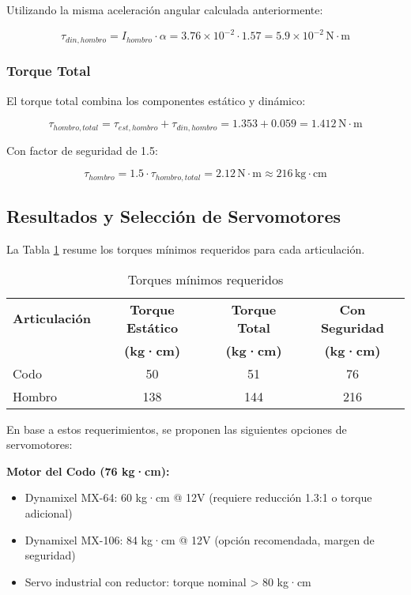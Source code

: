 Utilizando la misma aceleración angular calculada anteriormente:

\begin{equation}
\tau_{din,hombro} = I_{hombro} \cdot \alpha = 3.76 \times 10^{-2} \cdot 1.57 = 5.9 \times 10^{-2} \, \text{N} \cdot \text{m}
\end{equation}

\subsubsection{Torque Total}

El torque total combina los componentes estático y dinámico:

\begin{equation}
\tau_{hombro,total} = \tau_{est,hombro} + \tau_{din,hombro} = 1.353 + 0.059 = 1.412 \, \text{N} \cdot \text{m}
\end{equation}

Con factor de seguridad de 1.5:

\begin{equation}
\tau_{hombro} = 1.5 \cdot \tau_{hombro,total} = 2.12 \, \text{N} \cdot \text{m} \approx 216 \, \text{kg} \cdot \text{cm}
\end{equation}

\subsection{Resultados y Selección de Servomotores}

La Tabla \ref{tab:resultados_torque} resume los torques mínimos requeridos para cada articulación.

\begin{table}[h]
\centering
\caption{Torques mínimos requeridos}
\label{tab:resultados_torque}
\begin{tabular}{lccc}
\hline
\textbf{Articulación} & \textbf{Torque Estático} & \textbf{Torque Total} & \textbf{Con Seguridad} \\
 & \textbf{(kg·cm)} & \textbf{(kg·cm)} & \textbf{(kg·cm)} \\
\hline
Codo & 50 & 51 & 76 \\
Hombro & 138 & 144 & 216 \\
\hline
\end{tabular}
\end{table}

En base a estos requerimientos, se proponen las siguientes opciones de servomotores:

\textbf{Motor del Codo (76 kg·cm):}
\begin{itemize}
    \item Dynamixel MX-64: 60 kg·cm @ 12V (requiere reducción 1.3:1 o torque adicional)
    \item Dynamixel MX-106: 84 kg·cm @ 12V (opción recomendada, margen de seguridad)
    \item Servo industrial con reductor: torque nominal > 80 kg·cm
\end{itemize}

